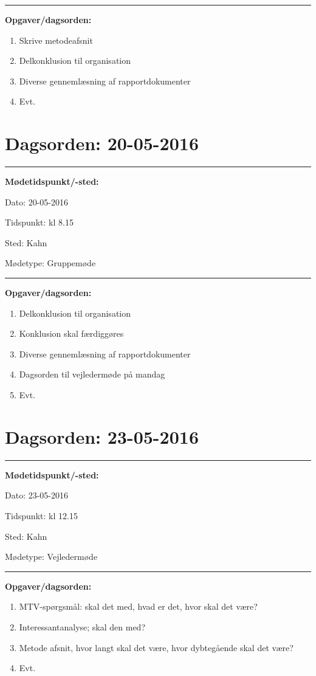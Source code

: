 \hrule
\textbf{Opgaver/dagsorden:} \newline
\begin{enumerate}
	\item Skrive metodeafsnit
	\item Delkonklusion til organisation
	\item Diverse gennemlæsning af rapportdokumenter
	\item Evt. 
\end{enumerate}

\newpage

\section{Dagsorden: 20-05-2016 }
\hrule
\textbf{Mødetidspunkt/-sted:} 

Dato: \tabto{7em} 20-05-2016

Tidspunkt: \tabto{7em} kl 8.15

Sted: \tabto{7em} Kahn 

Mødetype: \tabto{7em} Gruppemøde \newline


\hrule
\textbf{Opgaver/dagsorden:} \newline
\begin{enumerate}
	\item Delkonklusion til organisation
	\item Konklusion skal færdiggøres 
	\item Diverse gennemlæsning af rapportdokumenter
	\item Dagsorden til vejledermøde på mandag 
	\item Evt. 
\end{enumerate}


\section{Dagsorden: 23-05-2016 }
\hrule
\textbf{Mødetidspunkt/-sted:} 

Dato: \tabto{7em} 23-05-2016

Tidspunkt: \tabto{7em} kl 12.15

Sted: \tabto{7em} Kahn 

Mødetype: \tabto{7em} Vejledermøde \newline


\hrule
\textbf{Opgaver/dagsorden:} \newline
\begin{enumerate}
	\item MTV-spørgsmål: skal det med, hvad er det, hvor skal det være?
	\item Interessantanalyse; skal den med? 
	\item Metode afsnit, hvor langt skal det være, hvor dybtegående skal det være? 
	\item Evt. 
\end{enumerate}

